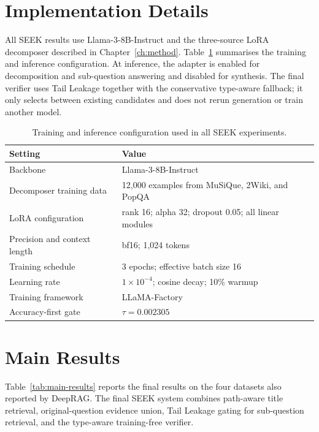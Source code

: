 \documentclass{nthu_thesis}
\begin{document}
\begin{thesiscjk}
\section{Implementation Details}

All SEEK results use Llama-3-8B-Instruct and the three-source LoRA decomposer described in Chapter~\ref{ch:method}. Table~\ref{tab:implementation-details} summarises the training and inference configuration. At inference, the adapter is enabled for decomposition and sub-question answering and disabled for synthesis. The final verifier uses Tail Leakage together with the conservative type-aware fallback; it only selects between existing candidates and does not rerun generation or train another model.

\begin{table}[h]
    \centering
    \caption[Implementation Details]{Training and inference configuration used in all SEEK experiments.}
    \label{tab:implementation-details}
    \setlength{\tabcolsep}{8pt}
    \small
    \begin{tabular}{ l l }
        \toprule
        Setting & Value \\
        \midrule
        Backbone & Llama-3-8B-Instruct \\
        Decomposer training data & 12{,}000 examples from MuSiQue, 2Wiki, and PopQA \\
        LoRA configuration & rank 16; alpha 32; dropout 0.05; all linear modules \\
        Precision and context length & bf16; 1{,}024 tokens \\
        Training schedule & 3 epochs; effective batch size 16 \\
        Learning rate & $1\times10^{-4}$; cosine decay; 10\% warmup \\
        Training framework & LLaMA-Factory~\cite{llamafactory} \\
        Accuracy-first gate & $\tau=0.002305$ \\
        \bottomrule
    \end{tabular}
\end{table}


\section{Main Results}
\label{sec:main-results}

Table~\ref{tab:main-results} reports the final results on the four datasets also reported by DeepRAG. The final SEEK system combines path-aware title retrieval, original-question evidence union, Tail Leakage gating for sub-question retrieval, and the type-aware training-free verifier.


\end{thesiscjk}
\end{document}
